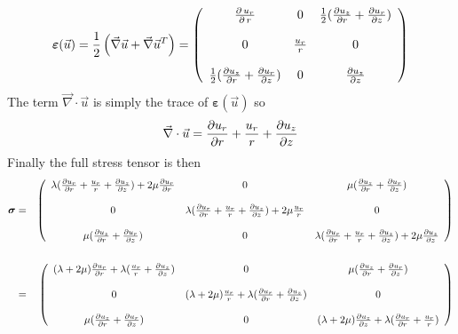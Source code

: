 \begin{equation}
\label{eq:strain_as} 
{\bm \varepsilon}(\vec{u})
=\frac12\left(\vec\nabla \vec{u}+\vec\nabla \vec{u}^T\right)
=
\left(
\begin{array}{ccc}
{\partial \, u_r \over \partial \, r} &
0 &
\frac12({\partial u_{z} \over \partial r} + {\partial u_r \over \partial z}) \\ \\
0 & {u_r \over r} & 0 \\ \\
\frac12({\partial u_{z} \over \partial r} + {\partial u_r \over \partial z} ) & 0 & {\partial u_{z} \over \partial z} 
\end{array}
\right)
\end{equation}
The term $\vec\nabla \cdot \vec{u}$ is simply the trace of ${\bm \varepsilon}(\vec{u})$ so 
\[
\vec\nabla \cdot \vec{u}
= {\partial u_r \over \partial r} +{u_r \over r}
+{\partial u_{z} \over \partial z}
\]
Finally the full stress tensor is then 
\begin{eqnarray}
{\bm \sigma}
&=&
\left(
\begin{array}{ccc}
\lambda({\partial  u_r \over \partial  r}
+{u_r \over r} +{\partial  u_{z} \over \partial z}) +
2\mu {\partial  u_r \over \partial  r} &
0 & \mu({\partial u_{z} \over \partial  r} + {\partial u_r \over \partial z} ) \\
\\
0 & \lambda({\partial u_r \over \partial r}
+{u_r \over r} +{\partial u_{z} \over \partial z}) + 2\mu{u_r \over r} & 0 \\
\\
\mu({\partial u_{z} \over \partial r} + {\partial u_r \over \partial z} )&0 & \lambda({\partial u_r \over \partial r}
+{u_r \over r} +{\partial u_{z} \over \partial z}) +
2\mu{\partial  u_{z} \over \partial z}
\end{array}
\right) \nonumber\\ \nonumber\\
&=&
\left(
\begin{array}{ccc}
(\lambda+ 2\mu) {\partial u_r \over \partial r}
+\lambda ({u_r \over r} +{\partial  u_{z} \over \partial z})  &
0 &
\mu({\partial u_{z} \over \partial  r} + {\partial u_r \over \partial z} ) \\
\\
0 &
(\lambda+2\mu) \frac{u_r}{r}
+ \lambda({\partial  u_r \over \partial r}
+{\partial u_{z} \over \partial z}) &
0 \\
\\
\mu({\partial u_{z} \over \partial r} + {\partial u_r \over \partial z} ) &
0 &
(\lambda+2\mu) \frac{\partial u_z}{\partial z}
+\lambda({\partial u_r \over \partial r}
+{u_r \over r} ) 
\end{array}
\right) \nonumber
\end{eqnarray}

